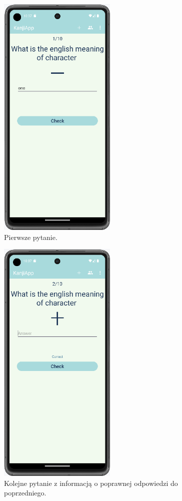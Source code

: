 \documentclass[a4paper,twoside,12pt]{book}
\begin{document}
\begin{figure}[]
\centering
\includegraphics[width=0.5\textwidth]{learn/start}
\caption{Pierwsze pytanie.}
\label{fig:start}
\end{figure}

\begin{figure}[]
\centering
\includegraphics[width=0.5\textwidth]{learn/correct}
\caption{Kolejne pytanie z informacją o poprawnej odpowiedzi do poprzedniego.}
\label{fig:correct}
\end{figure}
\end{document}

